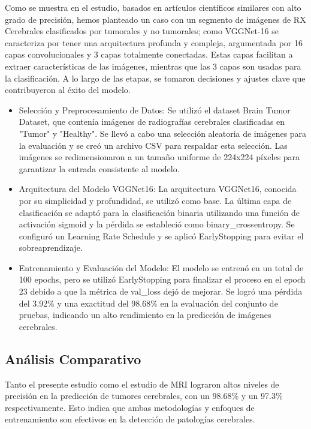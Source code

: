 \documentclass[12pt,twoside,titlepage]{ingenius}
\begin{document}
\begin{multicols}{2}
Como se muestra en el estudio, basados en artículos científicos similares con alto grado de precisión, hemos planteado un caso con un segmento de imágenes de RX Cerebrales clasificados por tumorales y no tumorales; como VGGNet-16 se caracteriza por tener una arquitectura profunda y compleja, argumentada por 16 capas convolucionales y 3 capas totalmente conectadas. Estas capas facilitan a extraer características de las imágenes, mientras que las 3 capas son usadas para la clasificación. 
A lo largo de las etapas, se tomaron decisiones y ajustes clave que contribuyeron al éxito del modelo.
\begin{itemize}
	\item Selección y Preprocesamiento de Datos: Se utilizó el dataset Brain Tumor Dataset, que contenía imágenes de radiografías cerebrales clasificadas en "Tumor" y "Healthy". Se llevó a cabo una selección aleatoria de imágenes para la evaluación y se creó un archivo CSV para respaldar esta selección. Las imágenes se redimensionaron a un tamaño uniforme de 224x224 píxeles para garantizar la entrada consistente al modelo.
	\item Arquitectura del Modelo VGGNet16: La arquitectura VGGNet16, conocida por su simplicidad y profundidad, se utilizó como base. La última capa de clasificación se adaptó para la clasificación binaria utilizando una función de activación sigmoid y la pérdida se estableció como binary\_crossentropy. Se configuró un Learning Rate Schedule y se aplicó EarlyStopping para evitar el sobreaprendizaje.
	\item Entrenamiento y Evaluación del Modelo: El modelo se entrenó en un total de 100 epochs, pero se utilizó EarlyStopping para finalizar el proceso en el epoch 23 debido a que la métrica de val\_loss dejó de mejorar. Se logró una pérdida del 3.92\% y una exactitud del 98.68\% en la evaluación del conjunto de pruebas, indicando un alto rendimiento en la predicción de imágenes cerebrales.
\end{itemize}

\subsection{Análisis Comparativo}
Tanto el presente estudio como el estudio de MRI lograron altos niveles de precisión en la predicción de tumores cerebrales, con un 98.68\% y un 97.3\% respectivamente. Esto indica que ambas metodologías y enfoques de entrenamiento son efectivos en la detección de patologías cerebrales.\\


\end{multicols}
\end{document}
